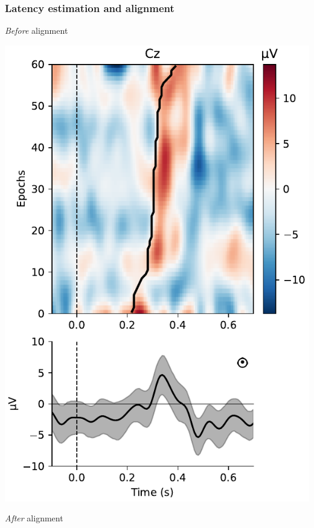 \documentclass{kul-ulille-beamer}
\begin{document}
\begin{frame}
  \frametitle{Latency estimation and alignment}
  \begin{minipage}{.3\textwidth}
    \centering
    \emph{Before} alignment
    \smallskip

    \includegraphics[width=\textwidth]{figures/covert/align_before.pdf}
  \end{minipage}
  \begin{minipage}{.3\textwidth}
    \centering
    \emph{After} alignment
    \smallskip


\end{minipage}
\end{frame}
\end{document}

